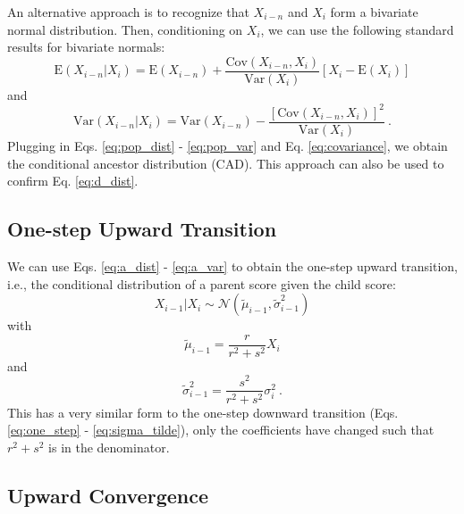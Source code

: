 \documentclass{svproc} %
\begin{document}
An alternative approach is to recognize that $X_{i-n}$ and $X_i$ form a bivariate normal distribution. Then, conditioning on $X_i$, we can use the following standard results for bivariate normals: 
\begin{equation}
\mathrm{E}(X_{i-n}|X_i) = \mathrm{E}(X_{i-n}) + \frac{\mathrm{Cov}(X_{i-n}, X_i)}{\mathrm{Var}(X_i)}[X_i - \mathrm{E}(X_i)]
\end{equation}
and 
\begin{equation}
\mathrm{Var}(X_{i-n}|X_i) = \mathrm{Var}(X_{i-n}) - \frac{[\mathrm{Cov}(X_{i-n}, X_i)]^2}{\mathrm{Var}(X_i)} \ .
\end{equation}
Plugging in Eqs. \ref{eq:pop_dist} - \ref{eq:pop_var} and Eq. \ref{eq:covariance}, we obtain the conditional ancestor distribution (CAD). This approach can also be used to confirm Eq. \ref{eq:d_dist}.

\subsection{One-step Upward Transition}
We can use Eqs. \ref{eq:a_dist} - \ref{eq:a_var} to obtain the one-step upward transition, i.e., the conditional distribution of a parent score given the child score:
\begin{equation}
X_{i-1}|X_i \sim \mathcal{N}( \tilde{\mu}_{i-1}, \tilde{\sigma}_{i-1}^2)
\label{eq:up_dist}
\end{equation}
with
\begin{equation}
\tilde{\mu}_{i-1} = \frac{r}{r^2+s^2} X_i
\label{eq:up_mean}
\end{equation}
and
\begin{equation}
\tilde{\sigma}_{i-1}^2 = \frac{s^2}{r^2+s^2} \sigma_i^2 \ .
\label{eq:up_var}
\end{equation}
This has a very similar form to the one-step downward transition (Eqs. \ref{eq:one_step} - \ref{eq:sigma_tilde}), only the coefficients have changed such that $r^2 + s^2$ is in the denominator. 


\subsection{Upward Convergence}
\end{document}
